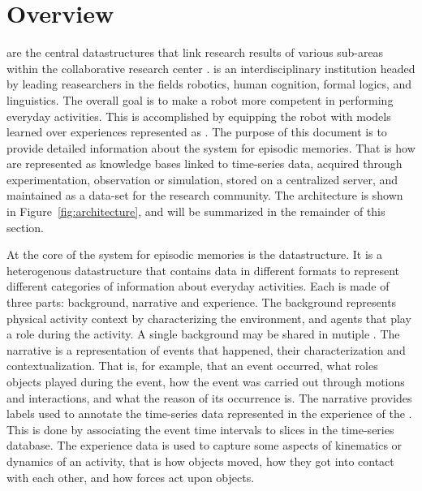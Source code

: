 \section{Overview}
\label{sec:overview}

\neems are the central datastructures that link research results of various sub-areas within the collaborative research center \ease.
\ease is an interdisciplinary institution headed by leading reasearchers in the fields robotics, human cognition, formal logics, and linguistics.
The overall goal is to make a robot more competent in performing everyday activities.
This is accomplished by equipping the robot with models learned over experiences represented as \neems.
The purpose of this document is to provide detailed information about the \ease system for episodic memories.
That is how \neems are
represented as knowledge bases linked to time-series data,
acquired through experimentation, observation or simulation,
stored on a centralized server, and
maintained as a data-set for the research community.
The architecture is shown in Figure~\ref{fig:architecture}, and will be summarized in the remainder of this section.

At the core of the \ease system for episodic memories is the \neem datastructure.
It is a heterogenous datastructure that contains data in different formats to represent different categories of information about everyday activities.
Each \neem is made of three parts: background, narrative and experience.
The background represents physical activity context by characterizing the environment, and agents that play a role during the activity.
A single background may be shared in mutiple \neems.
The narrative is a representation of events that happened, their characterization and contextualization.
That is, for example, that an event occurred, what roles objects played during the event, how the event was carried out through motions and interactions, and what the reason of its occurrence is.
The narrative provides labels used to annotate the time-series data represented in the experience of the \neem.
This is done by associating the event time intervals to slices in the time-series database.
The experience data is used to capture some aspects of kinematics or dynamics of an activity, that is how objects moved, how they got into contact with each other, and how forces act upon objects.

